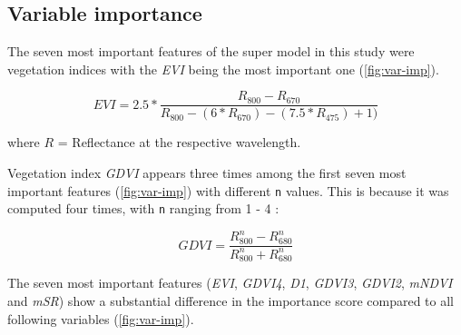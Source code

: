 \documentclass[review]{elsarticle}
\begin{document}
\subsection{Variable importance}

\noindent The seven most important features of the super model in this study were vegetation indices with the \textit{EVI} \citep{hueteComparisonVegetationIndices1997} being the most important one (\autoref{fig:var-imp}).

\begin{equation}
	EVI = 2.5*\frac{R_{800}-R_{670}}{R_{800}-(6*R_{670})-(7.5*R_{475})+1)}
\end{equation}

\noindent where $R$ = Reflectance at the respective wavelength.

\bigbreak

\noindent Vegetation index \textit{GDVI} appears three times among the first seven most important features (\autoref{fig:var-imp}) with different \texttt{n} values.
This is because it was computed four times, with \texttt{n} ranging from 1 - 4 \citep{wuEstimatingChlorophyllContent2008}:

\begin{equation}
	GDVI = \frac{R_{800}^n-R_{680}^n}{R_{800}^n+R_{680}^n}
\end{equation}

\bigbreak

\noindent The seven most important features (\textit{EVI}, \textit{GDVI4}, \textit{D1}, \textit{GDVI3}, \textit{GDVI2}, \textit{mNDVI} and \textit{mSR}) show a substantial difference in the importance score compared to all following variables (\autoref{fig:var-imp}).
\end{document}
